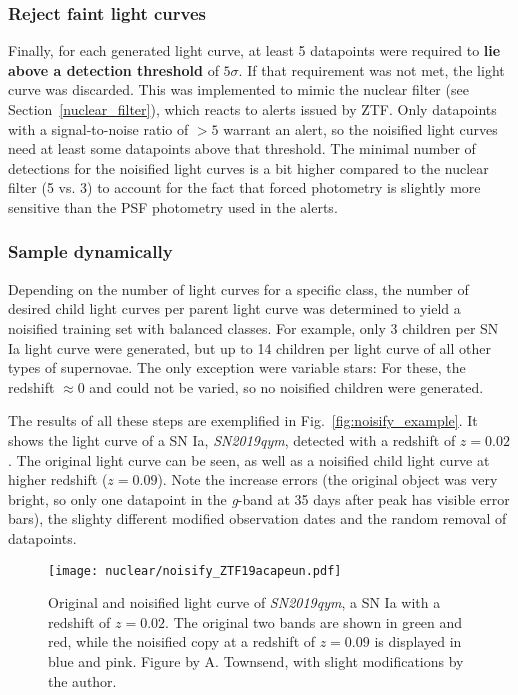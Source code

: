 \subsubsection{Reject faint light curves}
Finally, for each generated light curve, at least 5 datapoints were required to \textbf{lie above a detection threshold} of $5 \sigma$. If that requirement was not met, the light curve was discarded. This was implemented to mimic the nuclear filter (see Section~\ref{nuclear_filter}), which reacts to alerts issued by ZTF. Only datapoints with a signal-to-noise ratio of $>5$ warrant an alert, so the noisified light curves need at least some datapoints above that threshold. The minimal number of detections for the noisified light curves is a bit higher compared to the nuclear filter (5 vs. 3) to account for the fact that forced photometry is slightly more sensitive than the PSF photometry used in the alerts.

\subsubsection{Sample dynamically}
Depending on the number of light curves for a specific class, the number of desired child light curves per parent light curve was determined to yield a noisified training set with balanced classes. For example, only 3 children per SN Ia light curve were generated, but up to 14 children per light curve of all other types of supernovae. The only exception were variable stars: For these, the redshift $\approx 0$ and could not be varied, so no noisified children were generated.

The results of all these steps are exemplified in Fig.~\ref{fig:noisify_example}. It shows the light curve of a SN Ia, \textit{SN2019qym}, detected with a redshift of $z=0.02$. The original light curve can be seen, as well as a noisified child light curve at higher redshift ($z=0.09$). Note the increase errors (the original object was very bright, so only one datapoint in the \textit{g}-band at 35 days after peak has visible error bars), the slighty different modified observation dates and the random removal of datapoints.

\begin{figure}[H]
    \texttt{[image: nuclear/noisify\_ZTF19acapeun.pdf]}
    \caption[Noisification example]{Original and noisified light curve of \textit{SN2019qym}, a SN Ia with a redshift of $z=0.02$. The original two bands are shown in green and red, while the noisified copy at a redshift of $z=0.09$ is displayed in blue and pink. Figure by A. Townsend, with slight modifications by the author.}
\end{figure}

